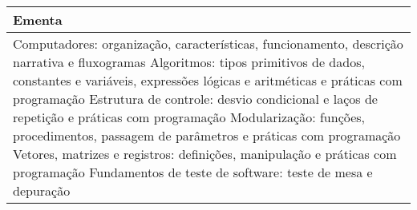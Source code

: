 \begin{quadro}[ht!]
\begin{tabular}{|p{3cm} p{2cm} p{3cm} p{2cm} p{3cm} p{2cm}|}
\multicolumn{6}{|p{15cm}|}{\cellcolor{blue1} Ementa} \\\hline
\hline\multicolumn{6}{|p{15cm}|}{\scriptsize Computadores: organização, características, funcionamento, descrição narrativa e fluxogramas Algoritmos: tipos primitivos de dados, constantes e variáveis, expressões lógicas e aritméticas e práticas com programação Estrutura de controle: desvio condicional e laços de repetição e práticas com programação Modularização: funções, procedimentos, passagem de parâmetros e práticas com programação Vetores, matrizes e registros: definições, manipulação e práticas com programação Fundamentos de teste de software: teste de mesa e depuração}\\\hline 
\hline
	\end{tabular}
\end{quadro}



